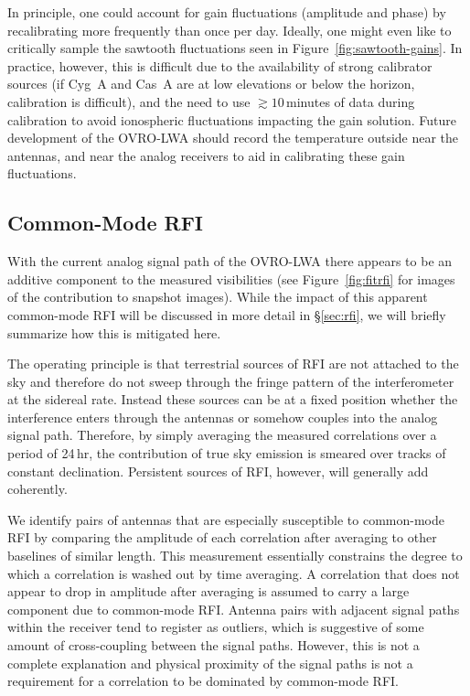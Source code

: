 \begin{bibunit}
In principle, one could account for gain fluctuations (amplitude and phase) by recalibrating more
frequently than once per day. Ideally, one might even like to critically sample the sawtooth
fluctuations seen in Figure~\ref{fig:sawtooth-gains}. In practice, however, this is difficult due to
the availability of strong calibrator sources (if Cyg~A and Cas~A are at low elevations or below the
horizon, calibration is difficult), and the need to use $\gtrsim 10$\,minutes of data during
calibration to avoid ionospheric fluctuations impacting the gain solution. Future development of the
OVRO-LWA should record the temperature outside near the antennas, and near the analog receivers to
aid in calibrating these gain fluctuations.

\subsection{Common-Mode RFI}

With the current analog signal path of the OVRO-LWA there appears to be an additive component to the
measured visibilities (see Figure~\ref{fig:fitrfi} for images of the contribution to snapshot
images). While the impact of this apparent common-mode RFI will be discussed in more detail in
\S\ref{sec:rfi}, we will briefly summarize how this is mitigated here.

The operating principle is that terrestrial sources of RFI are not attached to the sky and therefore
do not sweep through the fringe pattern of the interferometer at the sidereal rate. Instead these
sources can be at a fixed position whether the interference enters through the antennas or somehow
couples into the analog signal path. Therefore, by simply averaging the measured correlations over a
period of 24\,hr, the contribution of true sky emission is smeared over tracks of constant
declination. Persistent sources of RFI, however, will generally add coherently.

We identify pairs of antennas that are especially susceptible to common-mode RFI by comparing the
amplitude of each correlation after averaging to other baselines of similar length. This measurement
essentially constrains the degree to which a correlation is washed out by time averaging. A
correlation that does not appear to drop in amplitude after averaging is assumed to carry a large
component due to common-mode RFI.  Antenna pairs with adjacent signal paths within the receiver tend
to register as outliers, which is suggestive of some amount of cross-coupling between the signal
paths. However, this is not a complete explanation and physical proximity of the signal paths is not
a requirement for a correlation to be dominated by common-mode RFI.


\end{bibunit}
